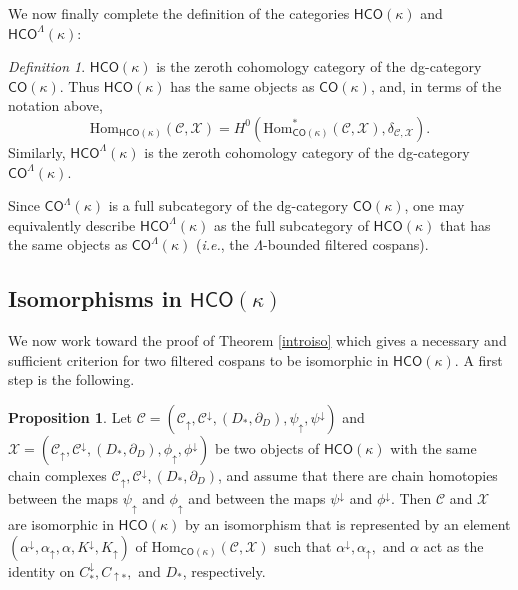 \documentclass[11pt]{amsart}
\theoremstyle{definition}
\newtheorem{prop}[theorem]{Proposition}
\theoremstyle{remark}
\newtheorem{dfn}[theorem]{Definition}
\numberwithin{equation}{section}
\begin{document}
	









We now finally complete the definition of the categories $\mathsf{HCO}(\kappa)$ and $\mathsf{HCO}^{\Lambda}(\kappa)$:

\begin{dfn} $\mathsf{HCO}(\kappa)$ is the zeroth cohomology category of the dg-category $\mathsf{CO}(\kappa)$.  Thus $\mathsf{HCO}(\kappa)$ has the same objects as $\mathsf{CO}(\kappa)$, and, in terms of the notation above, \[ \mathrm{Hom}_{\mathsf{HCO}(\kappa)}(\mathcal{C},\mathcal{X})=H^0\left(\mathrm{Hom}^*_{\mathsf{CO}(\kappa)}(\mathcal{C},\mathcal{X}),\delta_{\mathcal{C},\mathcal{X}}\right).\] Similarly, $\mathsf{HCO}^{\Lambda}(\kappa)$ is the zeroth cohomology category of the dg-category $\mathsf{CO}^{\Lambda}(\kappa)$.
\end{dfn}

Since $\mathsf{CO}^{\Lambda}(\kappa)$ is a full subcategory of the dg-category $\mathsf{CO}(\kappa)$, one may equivalently describe $\mathsf{HCO}^{\Lambda}(\kappa)$ as the full subcategory of $\mathsf{HCO}(\kappa)$ that has the same objects as $\mathsf{CO}^{\Lambda}(\kappa)$ (\emph{i.e.}, the $\Lambda$-bounded filtered cospans).

\subsection{Isomorphisms in $\mathsf{HCO}(\kappa)$}

We now work toward the proof of Theorem \ref{introiso} which gives a necessary and sufficient criterion for two filtered cospans to be isomorphic in $\mathsf{HCO}(\kappa)$. A first step is the following.

\begin{prop}\label{htopicpsi}
	Let $\mathcal{C}=\left(\mathcal{C}_{\uparrow},\mathcal{C}^{\downarrow},(D_*,\partial_D),\psi_{\uparrow},\psi^{\downarrow}\right)$ and $ \mathcal{X}=\left(\mathcal{C}_{\uparrow},\mathcal{C}^{\downarrow},(D_*,\partial_D),\phi_{\uparrow},\phi^{\downarrow}\right)$ be two objects of $\mathsf{HCO}(\kappa)$ with the same chain complexes $\mathcal{C}_{\uparrow},\mathcal{C}^{\downarrow},(D_*,\partial_D)$, and assume that there are chain homotopies between the maps $\psi_{\uparrow}$ and $\phi_{\uparrow}$ and between the maps $\psi^{\downarrow}$ and $\phi^{\downarrow}$.  Then $\mathcal{C}$ and $\mathcal{X}$ are isomorphic in $\mathsf{HCO}(\kappa)$ by an isomorphism that is represented by an element $(\alpha^{\downarrow},\alpha_{\uparrow},\alpha,K^{\downarrow},K_{\uparrow})$  of $\mathrm{Hom}_{\mathsf{CO}(\kappa)}(\mathcal{C},\mathcal{X})$ such that $\alpha^{\downarrow},\alpha_{\uparrow},$ and $\alpha$ act as the identity on $C^{\downarrow}_{*},C_{\uparrow*},$ and $D_*$, respectively.
\end{prop}
\end{document}
